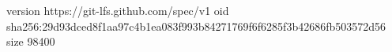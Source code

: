 version https://git-lfs.github.com/spec/v1
oid sha256:29d93dced8f1aa97c4b1ea083f993b84271769f6f6285f3b42686fb503572d56
size 98400
